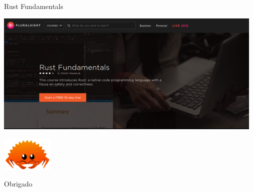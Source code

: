 \documentclass[aspectratio=169]{beamer}
\begin{document}
\begin{frame}{Rust Fundamentals}
	\begin{center}
		\includegraphics[width=13.0cm]{imgs/pluralsight.png}	
	\end{center}
\end{frame}

\begin{frame}[standout]
	\begin{center}
		\includegraphics[width=2.5cm]{imgs/rustacean.png}
	\end{center}
  	Obrigado
  		
\end{frame}
\end{document}
